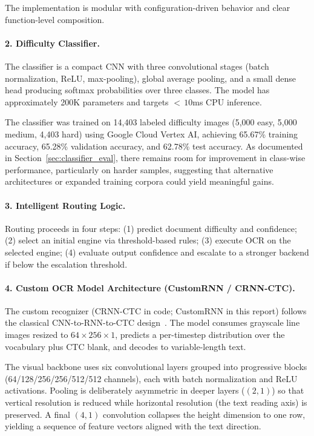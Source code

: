 \documentclass[12pt,a4paper]{article}
\begin{document}
The implementation is modular with configuration-driven behavior and
clear function-level composition.

\paragraph{2. Difficulty Classifier.}

The classifier is a compact CNN with three convolutional stages
(batch normalization, ReLU, max-pooling), global average pooling, and
a small dense head producing softmax probabilities over three classes.
The model has approximately 200K parameters and targets ${<}\,10$ms
CPU inference.

The classifier was trained on 14,403 labeled difficulty images (5,000
easy, 5,000 medium, 4,403 hard) using Google Cloud Vertex AI,
achieving 65.67\% training accuracy, 65.28\% validation accuracy, and
62.78\% test accuracy. As documented in Section~\ref{sec:classifier_eval},
there remains room for improvement in class-wise performance, particularly
on harder samples, suggesting that alternative architectures or expanded
training corpora could yield meaningful gains.

\paragraph{3. Intelligent Routing Logic.}

Routing proceeds in four steps: (1) predict document difficulty and
confidence; (2) select an initial engine via threshold-based rules;
(3) execute OCR on the selected engine; (4) evaluate output
confidence and escalate to a stronger backend if below the escalation
threshold.

\paragraph{4. Custom OCR Model Architecture (CustomRNN / CRNN-CTC).}


The custom recognizer (CRNN-CTC in code; CustomRNN in this report)
follows the classical CNN-to-RNN-to-CTC design~\cite{ref:shi2015,ref:graves2006}. The
model consumes grayscale line images resized to
$64 \times 256 \times 1$, predicts a per-timestep distribution over
the vocabulary plus CTC blank, and decodes to variable-length text.

The visual backbone uses six convolutional layers grouped into
progressive blocks (64/128/256/256/512/512 channels), each with batch
normalization and ReLU activations. Pooling is deliberately
asymmetric in deeper layers ($(2,1)$) so that vertical resolution is
reduced while horizontal resolution (the text reading axis) is
preserved. A final $(4,1)$ convolution collapses the height dimension
to one row, yielding a sequence of feature vectors aligned with the
text direction.
\end{document}
